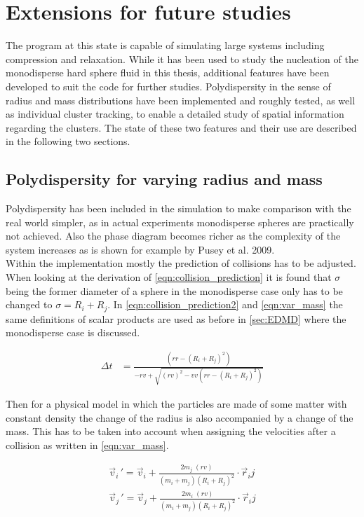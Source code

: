 \section{Extensions for future studies}
\label{sec:simulation_ext}
The program at this state is capable of simulating large systems including compression and relaxation. While it has been used to study the nucleation of the monodisperse hard sphere fluid in this thesis, additional features have been developed to suit the code for further studies. Polydispersity in the sense of radius and mass distributions have been implemented and roughly tested, as well as individual cluster tracking, to enable a detailed study of spatial information regarding the clusters. The state of these two features and their use are described in the following two sections.

\subsection{Polydispersity for varying radius and mass}
\label{sec:extension_radius}
Polydispersity has been included in the simulation to make comparison with the real world simpler, as in actual experiments monodisperse spheres are practically not achieved. Also the phase diagram becomes richer as the complexity of the system increases as is shown for example by Pusey et al. 2009\cite{Pusey2009}.\\ 
Within the implementation mostly the prediction of collisions has to be adjusted. When looking at the derivation of \autoref{eqn:collision_prediction} it is found that $\sigma$ being the former diameter of a sphere in the monodisperse case only has to be changed to $\sigma=R_i+R_j$. In \autoref{eqn:collision_prediction2} and \autoref{eqn:var_mass} the same definitions of scalar products are used as before in \autoref{sec:EDMD} where the monodisperse case is discussed.

\begin{align}
\label{eqn:collision_prediction2}
\Delta t &= \frac{\left(rr - (R_i+R_j)^2 \right)}{ - rv + \sqrt{ (rv)^2  - vv \left(rr - (R_i+R_j)^2 \right)}}
\end{align} 

Then for a physical model in which the particles are made of some matter with constant density the change of the radius is also accompanied by a change of the mass. This has to be taken into account when assigning the velocities after a collision as written in \autoref{eqn:var_mass}.

\begin{align}
\label{eqn:var_mass}
\vec{v}_i{\,'} = \vec{v}_i + \frac{2 m_j \; (rv)}{(m_i + m_j) (R_i+R_j)^2} \cdot \vec{r}_ij \nonumber \\
\vec{v}_j{\,'} = \vec{v}_j + \frac{2 m_i \; (rv)}{(m_i + m_j) (R_i+R_j)^2} \cdot \vec{r}_ij
\end{align}

